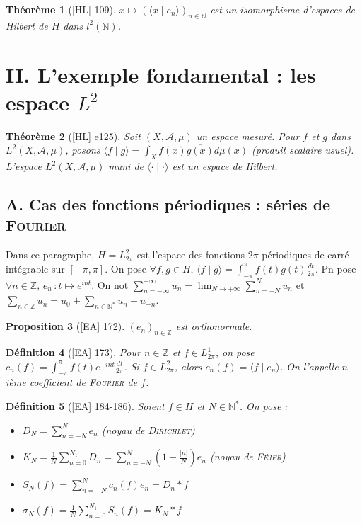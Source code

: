 \documentclass[10pt, a4paper, parskip=full, twoside, twocolumn]{report}
\newtheorem{definition}{Définition}
\newtheorem{theorem}[definition]{Théorème}
\newtheorem{proposition}[definition]{Proposition}
\newcommand{\IN}{\mathbb{N}}
\newcommand{\IZ}{\mathbb{Z}}
\newcommand{\A}{\mathcal{A}}
\newcommand{\ps}[2]{\langle #1\mid #2\rangle}
\begin{document}
\begin{theorem}[\textnormal{[HL] 109}]
	$x\mapsto (\ps{x}{e_n})_{n\in \IN}$ est un isomorphisme d'espaces de Hilbert de $H$ dans $l^2(\IN)$.
\end{theorem}

\section*{II. L'exemple fondamental : les espace $L^2$}
\begin{theorem}[\textnormal{[HL] e125}]
	Soit $(X,\A, \mu)$ un espace mesuré. Pour $f$ et $g$ dans $L^2(X,\A,\mu)$, posons $\ps{f}{g}= \int_{X}f(x)\overline{g(x)}d\mu(x)$ (produit scalaire usuel).
	L'espace $L^2(X,\A,\mu)$ muni de $\ps{\cdot}{\cdot}$ est un espace de Hilbert.
\end{theorem}

\subsection*{A. Cas des fonctions périodiques : séries de \textsc{Fourier}}
\textcolor{paragraphtext}{Dans ce paragraphe, $H = L^2_{2\pi}$ est l'espace des fonctions $2\pi$-périodiques de carré intégrable sur $[-\pi,\pi]$.
On pose $\forall f,g\in H,\, \ps{f}{g} = \int_{-\pi}^{\pi}f(t)\overline{g(t)}\frac{dt}{2\pi}$. Pn pose $\forall n\in \IZ,\, e_n\,\colon t\mapsto e^{int}$. On not $\sum_{n=-\infty}^{+\infty} u_n = \lim_{N\to +\infty}\sum_{n=-N}^{N} u_n$
et $\sum_{n\in \IZ}u_n = u_0 + \sum_{n\in\IN^*} u_n + u_{-n}$.}

\begin{proposition}[\textnormal{[EA] 172}]
	$\left(e_n\right)_{n\in \IZ}$ est orthonormale.
\end{proposition}

\begin{definition}[\textnormal{[EA] 173}]
	Pour $n\in \IZ$ et $f\in L_{2\pi}^1$, on pose $c_n(f) = \int_{-\pi}^{\pi}f(t)e^{-int}\frac{dt}{2\pi}$.
	Si $f\in L^2_{2\pi}$, alors $c_n(f)=\ps{f}{e_n}$. On l'appelle \emph{$n$-ième coefficient de \textsc{Fourier} de $f$}.
\end{definition}

\begin{definition}[\textnormal{[EA] 184-186}]
	Soient $f\in H$ et $N\in \IN^*$. On pose :
	\begin{itemize}
		\item $D_N = \sum_{n=-N}^{N} e_n$ (\emph{noyau de \textsc{Dirichlet}})
		\item $K_N = \frac{1}{N}\sum_{n=0}^{N_1} D_n = \sum_{n=-N}^{N} (1-\frac{\vert n\vert}{N})e_n$ (\emph{noyau de \textsc{Féjer}})
		\item $S_N(f) = \sum_{n=-N}^{N}c_n(f)e_n = D_n * f$
		\item $\sigma_N(f) = \frac{1}{N}\sum_{n=0}^{N_1}S_n(f) = K_N * f$
	\end{itemize}
\end{definition}
\end{document}
